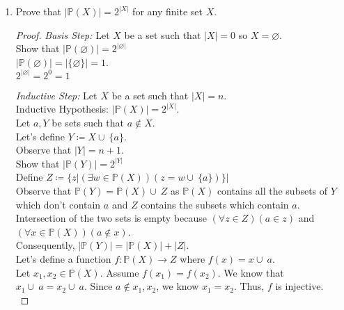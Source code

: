 \documentclass{article}
\newcommand{\Emptyset}{\varnothing}
\newcommand{\union}{\cup\:}
\newcommand{\intersect}{\cap\:}
\newcommand{\defeq}{\coloneqq}
\newcommand{\power}{\mathbb{P}}
\newenvironment{case}[1][Case]
    {\par\textit{#1:}\hfill\break}
    {}
\begin{document}
\begin{enumerate}
\begin{enumerate}
\begin{proof}
            $\binom{n}{k + 1} + \binom{n}{k}=|C|+|D|$.
            Additionally, $|C|+|D|=|C \union D|$ because $|C \intersect D|=0$ as $C$ only contains sets of cardinality $k+1$ and $D$ only contains sets of cardinality $k$.
             Additionaly observe that $B=C \union D$ by definition so $\binom{n}{k + 1} + \binom{n}{k}=|B|$.
            Consequently as $\binom{n+1}{k+1}=|A|$ and $\binom{n}{k + 1} + \binom{n}{k}=|B|$, we know that $\binom{n+1}{k+1} = \binom{n}{k + 1} + \binom{n}{k}$.
        \end{proof}
    \end{enumerate}
\pagebreak
  \item
    Prove that $|\power(X)| = 2^{|X|}$ for any finite set $X$.
    \begin{proof}
        \begin{case}[Basis Step]
        Let $X$ be a set such that $|X|=0$ so $X=\Emptyset$.\\
        Show that $|\power(\Emptyset)| = 2^{|\Emptyset|}$\\
        $|\power(\Emptyset)|=|\{\Emptyset\}|=1$.\\
        $2^{|\Emptyset|}=2^0=1$
        \end{case}
        \begin{case}[Inductive Step]
        Let $X$ be a set such that $|X|=n$.\\
        Inductive Hypothesis: $|\power(X)| = 2^{|X|}$.\\
        Let $a,Y$ be sets such that $a\notin X$.\\
        Let's define $Y\defeq X \union\{a\}$.\\
        Observe that $|Y|=n+1$.\\
        Show that $|\power(Y)| = 2^{|Y|}$\\
        Define $Z \defeq \{z|(\exists w \in \power(X))(z=w\union\{a\})\}|$\\
        Observe that $\power(Y)=\power(X)\union Z$ as $\power(X)$ contains all the subsets of $Y$ which don't contain $a$ and $Z$ contains the subsets which contain $a$.\\
        Intersection of the two sets is empty because $(\forall z \in Z)(a \in z)$ and $(\forall x \in \power(X))(a \notin x)$.\\ Consequently, $|\power(Y)|=|\power(X)|+|Z|$.\\
        Let's define a function $f:\power(X) \to Z$ where $f(x)=x\union{a}$.\\
        Let $x_1,x_2 \in \power(X)$. Assume $f(x_1)=f(x_2)$. We know that $x_1\union{a}=x_2\union{a}$. Since $a \notin x_1,x_2$, we know $x_1=x_2$. Thus, $f$ is injective.\\

\end{case}
\end{proof}
\end{enumerate}
\end{document}
